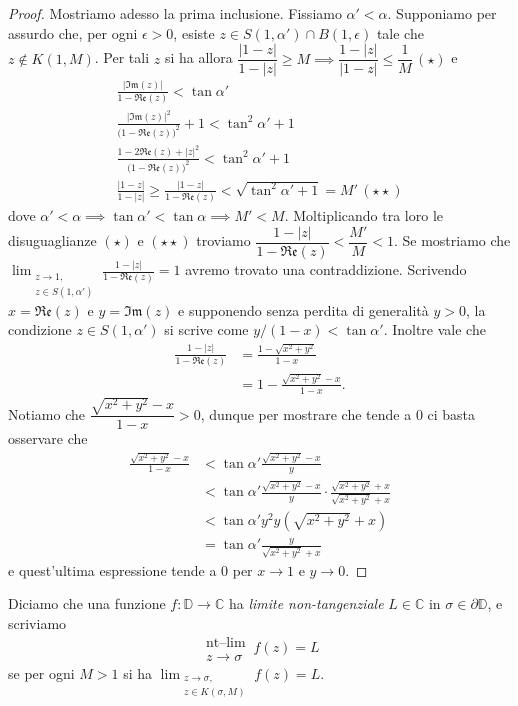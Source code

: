 \begin{proof}
  Mostriamo adesso la prima inclusione. Fissiamo $\alpha'<\alpha$. Supponiamo per assurdo che, per ogni $\epsilon>0$, esiste $z \in S(1,\alpha')\cap B(1,\epsilon)$ tale che $z \not\in K(1,M)$. Per tali $z$ si ha allora $\dfrac{|1-z|}{1-|z|} \ge M \implies \dfrac{1-|z|}{|1-z|} \le \dfrac{1}{M}\, (\star)$ e
  \begin{gather*}
    \frac{|\mathfrak{Im}(z)|}{1-\mathfrak{Re}(z)}<\tan{\alpha'} \\
    \frac{|\mathfrak{Im}(z)|^2}{\bigl(1-\mathfrak{Re}(z)\bigr)^2}+1<\tan^2{\alpha'}+1 \\
    \frac{1-2\mathfrak{Re}(z)+|z|^2}{\bigl(1-\mathfrak{Re}(z)\bigr)^2}<\tan^2{\alpha'}+1 \\
    \frac{|1-z|}{1-|z|}\ge \frac{|1-z|}{1-\mathfrak{Re}(z)}<\sqrt{\tan^2{\alpha'}+1}=M' \, (\star\star)
  \end{gather*}
  dove $\alpha'<\alpha \implies \tan{\alpha'}<\tan{\alpha} \implies M'<M$. Moltiplicando tra loro le disuguaglianze $(\star)$ e $(\star\star)$ troviamo $\dfrac{1-|z|}{1-\mathfrak{Re}(z)}<\dfrac{M'}{M}<1$.
  Se mostriamo che $\displaystyle \lim_{\substack{z \longrightarrow 1, \\ z \in S(1,\alpha')}} \frac{1-|z|}{1-\mathfrak{Re}(z)}=1$ avremo trovato una contraddizione. Scrivendo $x=\mathfrak{Re}(z)$ e $y=\mathfrak{Im}(z)$ e supponendo senza perdita di generalità $y>0$, la condizione $z \in S(1,\alpha')$ si scrive come $y/(1-x)<\tan{\alpha'}$. Inoltre vale che
  \begin{align*}
    \frac{1-|z|}{1-\mathfrak{Re}(z)} &=\frac{1-\sqrt{x^2+y^2}}{1-x} \\
    & =1-\frac{\sqrt{x^2+y^2}-x}{1-x}.
  \end{align*}
  Notiamo che $\dfrac{\sqrt{x^2+y^2}-x}{1-x}>0$, dunque per mostrare che tende a $0$ ci basta osservare che
  \begin{align*}
    \frac{\sqrt{x^2+y^2}-x}{1-x} & < \tan{\alpha'}\frac{\sqrt{x^2+y^2}-x}{y} \\
    & <\tan{\alpha'}\frac{\sqrt{x^2+y^2}-x}{y}\cdot\frac{\sqrt{x^2+y^2}+x}{\sqrt{x^2+y^2}+x} \\
    & <\tan{\alpha'}{y^2}{y(\sqrt{x^2+y^2}+x)} \\
    & =\tan{\alpha'}\frac{y}{\sqrt{x^2+y^2}+x}
  \end{align*}
  e quest'ultima espressione tende a $0$ per $x \longrightarrow 1$ e $y \longrightarrow 0$.
\end{proof}

\begin{defn}
  Diciamo che una funzione $f:\mathbb{D} \longrightarrow \mathbb{C}$ ha \textit{limite non-tangenziale} $L \in \mathbb{C}$ in $\sigma \in \partial\mathbb{D}$, e scriviamo
  $$\substack{\text{nt--lim} \\ z \longrightarrow \sigma} \, f(z)=L$$
  se  per ogni $M>1$ si ha $\displaystyle \lim_{\substack{z \longrightarrow \sigma, \\ z \in K(\sigma,M)}} f(z)=L$.
\end{defn}

